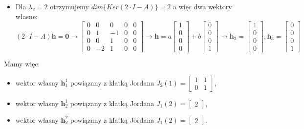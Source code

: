 \documentclass{article}
\begin{document}
\begin{itemize}
    \item Dla $\lambda_{2} = 2$ otrzymujemy $dim\{ Ker(2\cdot I-A)\} = 2$ a więc dwa wektory własne:
    $$
        (2\cdot I-A)\mathbf{h} = \mathbf{0} \rightarrow
        \left[
        \begin{array}{cccc|c}
            0 & 0 &  0 & 0 & 0\\
            0 & 1 & -1 & 0 & 0\\
            0 & 0 &  1 & 0 & 0\\
            0 &-2 &  1 & 0 & 0
        \end{array}
        \right]
        \rightarrow
        \mathbf{h}
        =
        a
        \begin{bmatrix}
            1 \\ 0 \\ 0 \\ 0
        \end{bmatrix}
        +
        b
        \begin{bmatrix}
            0 \\ 0 \\ 0 \\ 1
        \end{bmatrix}
        \rightarrow
        \mathbf{h}_{2}
        =
        \begin{bmatrix}
            1 \\ 0 \\ 0 \\ 0
        \end{bmatrix},
        \mathbf{h}_{3}
        =
        \begin{bmatrix}
            0 \\ 0 \\ 0 \\ 1
        \end{bmatrix}
    $$
\end{itemize}
Mamy więc:
\begin{itemize}
    \item wektor własny $\mathbf{h}_{1}^{1}$ powiązany z klatką Jordana $J_{2}(1) = \begin{bmatrix} 1 & 1\\ 0 & 1 \end{bmatrix}$,
    \item wektor własny $\mathbf{h}_{2}^{1}$ powiązany z klatką Jordana $J_{1}(2) = \begin{bmatrix} 2 \end{bmatrix}$,
    \item wektor własny $\mathbf{h}_{2}^{2}$ powiązany z klatką Jordana $J_{1}(2) = \begin{bmatrix} 2 \end{bmatrix}$.
\end{itemize}
\end{document}
